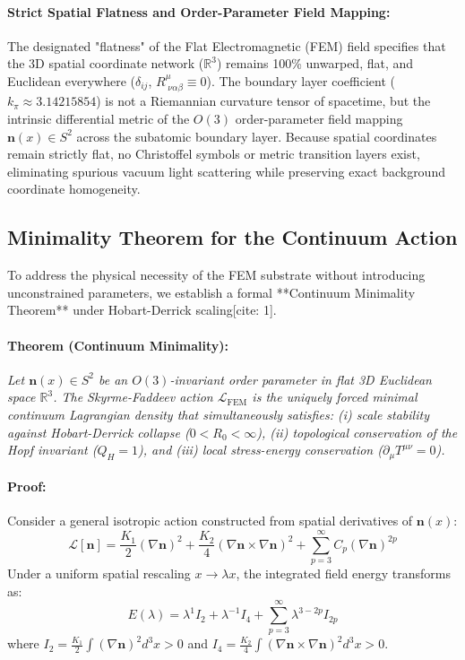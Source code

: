 \documentclass[11pt,a4paper]{article}
\begin{document}
	\paragraph{Strict Spatial Flatness and Order-Parameter Field Mapping:}
	The designated "flatness" of the Flat Electromagnetic (FEM) field specifies that the 3D spatial coordinate network ($\mathbb{R}^3$) remains 100\% unwarped, flat, and Euclidean everywhere ($\delta_{ij}$, $R^\mu_{\;\nu\alpha\beta} \equiv 0$). The boundary layer coefficient ($k_\pi \approx 3.14215854$) is not a Riemannian curvature tensor of spacetime, but the intrinsic differential metric of the $O(3)$ order-parameter field mapping $\mathbf{n}(x) \in S^2$ across the subatomic boundary layer. Because spatial coordinates remain strictly flat, no Christoffel symbols or metric transition layers exist, eliminating spurious vacuum light scattering while preserving exact background coordinate homogeneity.
	
	\subsection{Minimality Theorem for the Continuum Action}
	To address the physical necessity of the FEM substrate without introducing unconstrained parameters, we establish a formal **Continuum Minimality Theorem** under Hobart-Derrick scaling[cite: 1].
	
	\paragraph{Theorem (Continuum Minimality):}
	\textit{Let $\mathbf{n}(x) \in S^2$ be an $O(3)$-invariant order parameter in flat 3D Euclidean space $\mathbb{R}^3$. The Skyrme-Faddeev action $\mathcal{L}_{\text{FEM}}$ is the uniquely forced minimal continuum Lagrangian density that simultaneously satisfies: (i) scale stability against Hobart-Derrick collapse ($0 < R_0 < \infty$), (ii) topological conservation of the Hopf invariant ($Q_H = 1$), and (iii) local stress-energy conservation ($\partial_\mu T^{\mu\nu} = 0$).}
	
	\paragraph{Proof:}
	Consider a general isotropic action constructed from spatial derivatives of $\mathbf{n}(x)$:
	\begin{equation}
		\mathcal{L}[\mathbf{n}] = \frac{K_1}{2} (\nabla \mathbf{n})^2 + \frac{K_2}{4} (\nabla \mathbf{n} \times \nabla \mathbf{n})^2 + \sum_{p=3}^{\infty} C_p (\nabla \mathbf{n})^{2p}
	\end{equation}
	Under a uniform spatial rescaling $x \to \lambda x$, the integrated field energy transforms as:
	\begin{equation}
		E(\lambda) = \lambda^{1} I_2 + \lambda^{-1} I_4 + \sum_{p=3}^{\infty} \lambda^{3-2p} I_{2p}
	\end{equation}
	where $I_2 = \frac{K_1}{2} \int (\nabla \mathbf{n})^2 d^3x > 0$ and $I_4 = \frac{K_2}{4} \int (\nabla \mathbf{n} \times \nabla \mathbf{n})^2 d^3x > 0$. 
	
\end{document}
